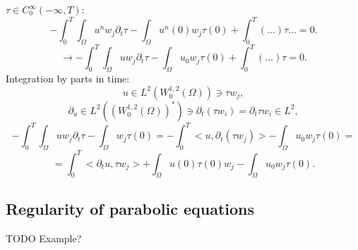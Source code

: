 \documentclass[12pt]{article}					%
\begin{document}
\begin{veta}
	\begin{dukazin}
		$\tau \in C_0^∞(-∞, T)$:
		$$ -\int_0^T \int_\Omega u^n w_j \partial_t \tau - \int_\Omega u^n(0) w_j \tau(0) + \int_0^T (…) \tau … = 0. $$
		$$ \rightarrow -\int_0^T \int_\Omega u w_j \partial_t \tau - \int_\Omega u_0 w_j \tau(0) + \int_0^T (…) \tau = 0. $$
		Integration by parts in time:
		$$ u \in L^2(W_0^{1, 2}(\Omega)) \ni \tau w_j, $$
		$$ \partial_u \in L^2((W_0^{1, 2}(\Omega))^*) \ni \partial_t(\tau w_i) = \partial_t \tau w_i \in L^2, $$
		$$ -\int_0^T \int_\Omega u w_j \partial_t \tau - \int_\Omega w_j \tau(0) = -\int_0^T <u, \partial_t(\tau w_j)> - \int_\Omega u_0 w_j \tau(0) = $$
		$$ = \int_0^T <\partial_t u, \tau w_j> + \int_\Omega u(0) \tau(0) w_j - \int_\Omega u_0 w_j \tau(0).$$
	\end{dukazin}
\end{veta}

\subsection{Regularity of parabolic equations}
TODO Example?
\end{document}
